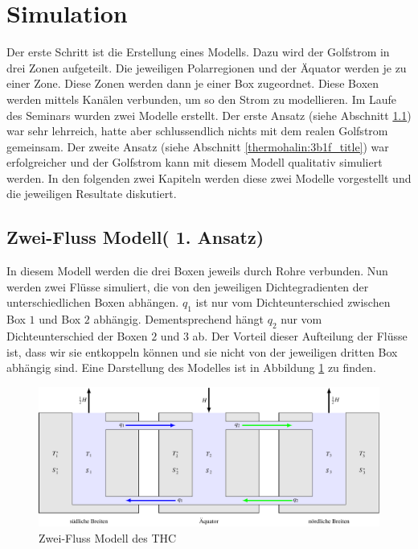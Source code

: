 \section{Simulation}

Der erste Schritt ist die Erstellung eines Modells.
Dazu wird der Golfstrom in drei Zonen aufgeteilt. Die jeweiligen Polarregionen und der Äquator werden je zu einer Zone. Diese Zonen werden dann je einer Box zugeordnet. Diese Boxen werden mittels Kanälen verbunden, um so den Strom zu modellieren. 
Im Laufe des Seminars wurden zwei Modelle erstellt. Der erste Ansatz (siehe Abschnitt \ref{thermohalin:3b2f_title}) war sehr lehrreich, hatte aber schlussendlich nichts mit dem realen Golfstrom gemeinsam. Der zweite Ansatz (siehe Abschnitt \ref{thermohalin:3b1f_title}) war erfolgreicher und der Golfstrom kann mit diesem Modell qualitativ simuliert werden.
In den folgenden zwei Kapiteln werden diese zwei Modelle vorgestellt und die jeweiligen Resultate diskutiert.

\subsection{Zwei-Fluss Modell( 1. Ansatz)}\label{thermohalin:3b2f_title}

In diesem Modell werden die drei Boxen jeweils durch Rohre verbunden. Nun werden zwei Flüsse simuliert, die von den jeweiligen Dichtegradienten der unterschiedlichen Boxen abhängen. $q_1$ ist nur vom Dichteunterschied zwischen Box $1$ und Box $2$ abhängig. Dementsprechend hängt $q_2$ nur vom Dichteunterschied der Boxen $2$ und $3$ ab.
Der Vorteil dieser Aufteilung der Flüsse ist, dass wir sie entkoppeln können und sie nicht von der jeweiligen dritten Box abhängig sind.
Eine Darstellung des Modelles ist in Abbildung \ref{thermohalin:3b2f} zu finden.

\begin{figure}
	\centering
	\includegraphics[width=14cm]{thermohalin/tikz/3b2f.pdf}
	\caption{Zwei-Fluss Modell des THC}
		\label{thermohalin:3b2f}
\end{figure}

